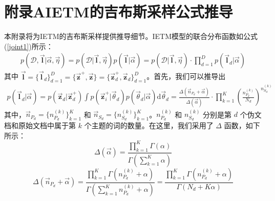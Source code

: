 \chapter[附录]{附录A\quad IETM的吉布斯采样公式推导}

本附录将为IETM的吉布斯采样提供推导细节。IETM模型的联合分布函数如公式(\ref{joint1})所示：
\begin{align}
\label{joint1}
p(\mathcal{D},\boldsymbol{\vec l}|\vec\alpha,\vec\eta) = p(\mathcal{D}|\boldsymbol{\vec l},\vec\eta)p(\boldsymbol{\vec l}|\vec\alpha)=p(\mathcal{D}|\boldsymbol{\vec l},\vec\eta)\cdot\prod_{d=1}^D p(\boldsymbol{\vec l}_d|\vec\alpha)
\end{align}
其中 $\boldsymbol{\vec l}=\{\boldsymbol{\vec l}_d\}_{d=1}^D=\{\boldsymbol{\vec z}^+, \boldsymbol{\vec z}\}=\{\boldsymbol{\vec z}_d^+,\boldsymbol{\vec z}_d\}_{d=1}^D$。首先，我们可以推导出
\begin{align}
p(\boldsymbol{\vec l}_d|\vec\alpha)=p(\boldsymbol{\vec z}_d|\boldsymbol{\vec z}_d^+)\int p(\boldsymbol{\vec z}_i^+|\vec\theta_d)p(\vec\theta_d|\vec\alpha)\mbox{d}\vec\theta_d=\frac{\Delta(\vec n_{P_d}+\vec\alpha)}{\Delta(\vec\alpha)}  \cdot\prod_{k=1}^K\left(\frac{n_{P_d}^{(k)}}{N_d}\right)^{n_{S_d}^{(k)}}
\end{align}
其中，$\vec n_{P_d}=\{n_{P_d}^{(k)}\}_{k=1}^K$ 和 $\vec n_{S_d}=\{n_{S_d}^{(k)}\}_{k=1}^K$。$n_{P_d}^{(k)}$ 和 $n_{S_d}^{(k)}$ 分别是第 $d$ 个伪文档和原始文档中属于第 $k$ 个主题的词的数量。在这里，我们采用了 $\Delta$ 函数，如下所示：
\begin{equation}
    \Delta(\vec\alpha)=\frac{\prod_{k=1}^K\Gamma(\alpha)}{\Gamma(\sum_{k=1}^K\alpha)}
\end{equation}
\begin{equation}
    \Delta(\vec n_{P_d}+\vec\alpha)=\frac{\prod_{k=1}^K\Gamma(n_{P_d}^{(k)}+\alpha)}{\Gamma(\sum_{k=1}^K n_{P_d}^{(k)}+\alpha)}=\frac{\prod_{k=1}^K\Gamma(n_{P_d}^{(k)}+\alpha)}{\Gamma(N_d+K\alpha)}
\end{equation}

